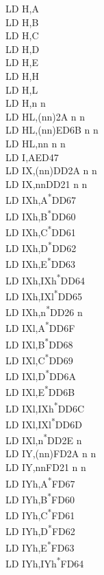 \documentclass[twoside,openright,a4paper]{book}
\begin{document}
\begin{multicols}{3}
{\begin{tabbing}
	LD H,A\\
	LD H,B\\
	LD H,C\\
	LD H,D\\
	LD H,E\\
	LD H,H\\
	LD H,L\\
	LD H,n n\\
	LD HL,(nn)\>2A n n\\
	LD HL,(nn)\>ED6B n n\\
	LD HL,nn n n\\
	LD I,A\>ED47\\
	LD IX,(nn)\>DD2A n n\\
	LD IX,nn\>DD21 n n\\
	LD IXh,A\textsuperscript{*}\>DD67\\
	LD IXh,B\textsuperscript{*}\>DD60\\
	LD IXh,C\textsuperscript{*}\>DD61\\
	LD IXh,D\textsuperscript{*}\>DD62\\
	LD IXh,E\textsuperscript{*}\>DD63\\
	LD IXh,IXh\textsuperscript{*}\>DD64\\
	LD IXh,IXl\textsuperscript{*}\>DD65\\
	LD IXh,n\textsuperscript{*}\>DD26 n \\
	LD IXl,A\textsuperscript{*}\>DD6F\\
	LD IXl,B\textsuperscript{*}\>DD68\\
	LD IXl,C\textsuperscript{*}\>DD69\\
	LD IXl,D\textsuperscript{*}\>DD6A\\
	LD IXl,E\textsuperscript{*}\>DD6B\\
	LD IXl,IXh\textsuperscript{*}\>DD6C\\
	LD IXl,IXl\textsuperscript{*}\>DD6D\\
	LD IXl,n\textsuperscript{*}\>DD2E n\\
	LD IY,(nn)\>FD2A n n\\
	LD IY,nn\>FD21 n n\\
	LD IYh,A\textsuperscript{*}\>FD67\\
	LD IYh,B\textsuperscript{*}\>FD60\\
	LD IYh,C\textsuperscript{*}\>FD61\\
	LD IYh,D\textsuperscript{*}\>FD62\\
	LD IYh,E\textsuperscript{*}\>FD63\\
	LD IYh,IYh\textsuperscript{*}\>FD64\\

\end{tabbing}}
\end{multicols}
\end{document}
